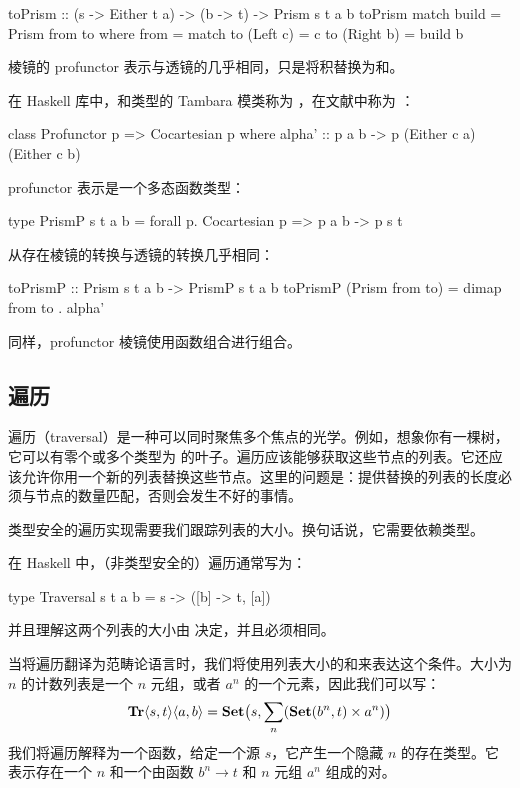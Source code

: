 \documentclass[DaoFP]{subfiles}
\begin{document}
\begin{haskell}
toPrism :: (s -> Either t a) -> (b -> t) -> Prism s t a b
toPrism match build = Prism from to
  where
    from = match
    to (Left  c) = c
    to (Right b) = build b
\end{haskell}

棱镜的 profunctor 表示与透镜的几乎相同，只是将积替换为和。

在 Haskell 库中，和类型的 Tambara 模类称为 ，在文献中称为 ：
\begin{haskell}
class Profunctor p => Cocartesian p where
  alpha' :: p a b -> p (Either c a) (Either c b)
\end{haskell}
profunctor 表示是一个多态函数类型：
\begin{haskell}
type PrismP s t a b = forall p. Cocartesian p => p a b -> p s t
\end{haskell}

从存在棱镜的转换与透镜的转换几乎相同：
\begin{haskell}
toPrismP :: Prism s t a b -> PrismP s t a b
toPrismP (Prism from to) = dimap from to . alpha'
\end{haskell}

同样，profunctor 棱镜使用函数组合进行组合。

\subsection{遍历}
遍历（traversal）是一种可以同时聚焦多个焦点的光学。例如，想象你有一棵树，它可以有零个或多个类型为  的叶子。遍历应该能够获取这些节点的列表。它还应该允许你用一个新的列表替换这些节点。这里的问题是：提供替换的列表的长度必须与节点的数量匹配，否则会发生不好的事情。

类型安全的遍历实现需要我们跟踪列表的大小。换句话说，它需要依赖类型。

在 Haskell 中，（非类型安全的）遍历通常写为：
\begin{haskell}
type Traversal s t a b = s -> ([b] -> t, [a])
\end{haskell}
并且理解这两个列表的大小由  决定，并且必须相同。

当将遍历翻译为范畴论语言时，我们将使用列表大小的和来表达这个条件。大小为 $n$ 的计数列表是一个 $n$ 元组，或者 $a^n$ 的一个元素，因此我们可以写：
\[ \mathbf{Tr} \langle s, t\rangle \langle a, b \rangle = \mathbf{Set} \big( s, \sum_n (\mathbf{Set} (b^n, t) \times a^n) \big) \]
我们将遍历解释为一个函数，给定一个源 $s$，它产生一个隐藏 $n$ 的存在类型。它表示存在一个 $n$ 和一个由函数 $b^n \to t$ 和 $n$ 元组 $a^n$ 组成的对。
\end{document}
